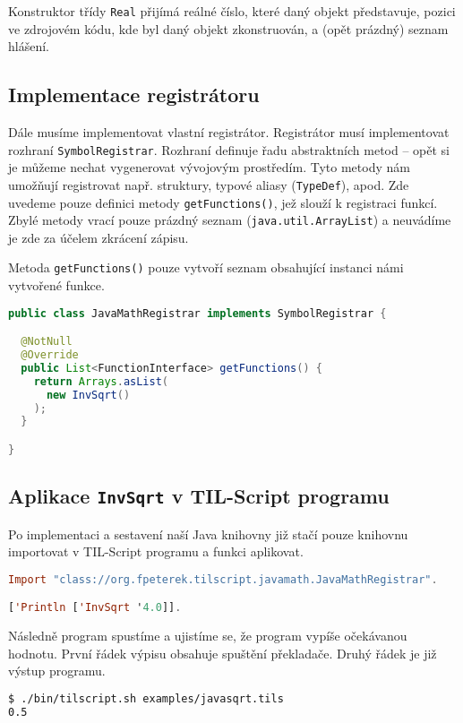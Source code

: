 Konstruktor třídy \lstinline{Real} přijímá reálné číslo, které daný objekt představuje, pozici
ve zdrojovém kódu, kde byl daný objekt zkonstruován, a (opět prázdný) seznam hlášení.

\subsection{Implementace registrátoru}

Dále musíme implementovat vlastní registrátor. Registrátor musí implementovat rozhraní
\lstinline{SymbolRegistrar}. Rozhraní definuje řadu abstraktních metod -- opět si je můžeme nechat
vygenerovat vývojovým prostředím. Tyto metody nám umožňují registrovat např. struktury, typové
aliasy (\lstinline{TypeDef}), apod. Zde uvedeme pouze definici metody \lstinline{getFunctions()},
jež slouží k registraci funkcí. Zbylé metody vrací pouze prázdný seznam
(\lstinline{java.util.ArrayList}) a neuvádíme je zde za účelem zkrácení zápisu.

Metoda \lstinline{getFunctions()} pouze vytvoří seznam obsahující instanci námi vytvořené funkce.

\begin{lstlisting}[caption={Java registrátor}, language=Java]
public class JavaMathRegistrar implements SymbolRegistrar {

  @NotNull
  @Override
  public List<FunctionInterface> getFunctions() {
    return Arrays.asList(
      new InvSqrt()
    );
  }

}
\end{lstlisting}

\subsection{Aplikace \lstinline{InvSqrt} v TIL-Script programu}

Po implementaci a sestavení naší Java knihovny již stačí pouze knihovnu importovat v TIL-Script
programu a funkci aplikovat.

\begin{lstlisting}[caption={Aplikace InvSqrt}, language=Haskell]
Import "class://org.fpeterek.tilscript.javamath.JavaMathRegistrar".

['Println ['InvSqrt '4.0]].
\end{lstlisting}

Následně program spustíme a ujistíme se, že program vypíše očekávanou hodnotu. První řádek výpisu
obsahuje spuštění překladače. Druhý řádek je již výstup programu.

\begin{lstlisting}[caption={Aplikace InvSqrt}, language=Bash]
$ ./bin/tilscript.sh examples/javasqrt.tils
0.5
\end{lstlisting}

\endinput
